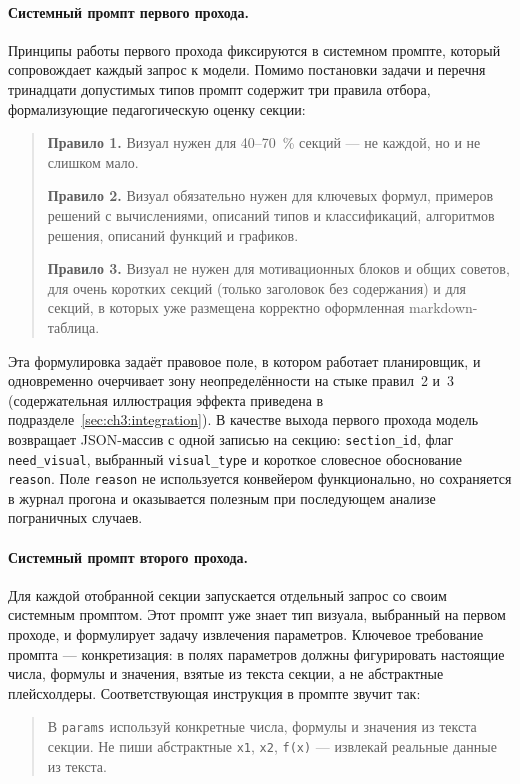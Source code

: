 \paragraph{Системный промпт первого прохода.} Принципы работы первого прохода фиксируются в системном промпте, который сопровождает каждый запрос к модели. Помимо постановки задачи и перечня тринадцати допустимых типов промпт содержит три правила отбора, формализующие педагогическую оценку секции:

\begin{quote}
\textbf{Правило 1.} Визуал нужен для 40--70~\% секций --- не каждой, но и не слишком мало.

\textbf{Правило 2.} Визуал обязательно нужен для ключевых формул, примеров решений с вычислениями, описаний типов и классификаций, алгоритмов решения, описаний функций и графиков.

\textbf{Правило 3.} Визуал не нужен для мотивационных блоков и общих советов, для очень коротких секций (только заголовок без содержания) и для секций, в которых уже размещена корректно оформленная markdown-таблица.
\end{quote}

\noindent Эта формулировка задаёт правовое поле, в котором работает планировщик, и одновременно очерчивает зону неопределённости на стыке правил~2 и~3 (содержательная иллюстрация эффекта приведена в подразделе~\ref{sec:ch3:integration}). В качестве выхода первого прохода модель возвращает JSON-массив с одной записью на секцию: \texttt{section\_id}, флаг \texttt{need\_visual}, выбранный \texttt{visual\_type} и короткое словесное обоснование \texttt{reason}. Поле \texttt{reason} не используется конвейером функционально, но сохраняется в журнал прогона и оказывается полезным при последующем анализе пограничных случаев.

\paragraph{Системный промпт второго прохода.} Для каждой отобранной секции запускается отдельный запрос со своим системным промптом. Этот промпт уже знает тип визуала, выбранный на первом проходе, и формулирует задачу извлечения параметров. Ключевое требование промпта --- конкретизация: в полях параметров должны фигурировать настоящие числа, формулы и значения, взятые из текста секции, а не абстрактные плейсхолдеры. Соответствующая инструкция в промпте звучит так:

\begin{quote}
В \texttt{params} используй конкретные числа, формулы и значения из текста секции. Не пиши абстрактные \texttt{x1}, \texttt{x2}, \texttt{f(x)} --- извлекай реальные данные из текста.
\end{quote}

